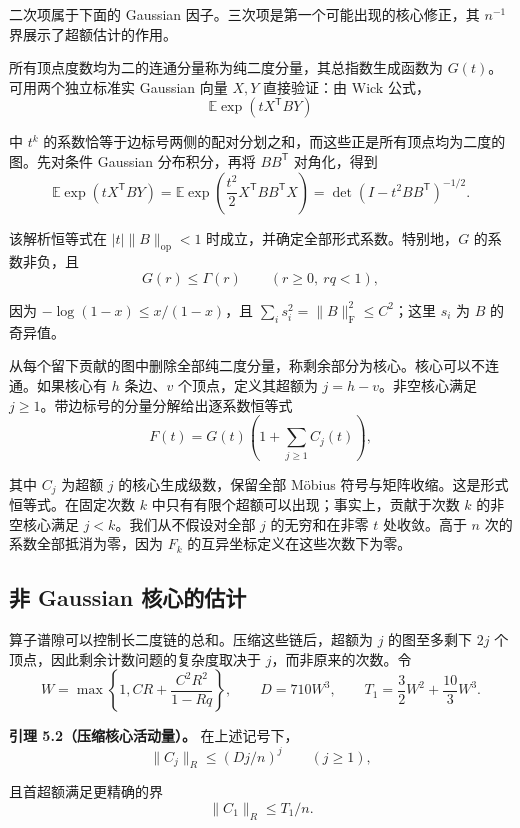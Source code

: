 \documentclass[11pt,a4paper]{article}
\makeatletter
\newcommand{\paperstatement}[3]{\par\addvspace{6pt}\Needspace{4\baselineskip}\phantomsection\def\@currentlabel{#2}\label{#3}\noindent\textbf{#1}\enspace}
\makeatother
\begin{document}
二次项属于下面的 Gaussian 因子。三次项是第一个可能出现的核心修正，其 \(n^{-1}\) 界展示了超额估计的作用。

所有顶点度数均为二的连通分量称为纯二度分量，其总指数生成函数为 \(G(t)\)。可用两个独立标准实 Gaussian 向量 \(X,Y\) 直接验证：由 Wick 公式，
\[\mathbb E\exp(tX^{\mathsf T}BY)\]

中 \(t^k\) 的系数恰等于边标号两侧的配对分划之和，而这些正是所有顶点均为二度的图。先对条件 Gaussian 分布积分，再将 \(BB^{\mathsf T}\) 对角化，得到
\[\mathbb E\exp(tX^{\mathsf T}BY)
=\mathbb E\exp\!\left(\frac{t^2}{2}X^{\mathsf T}BB^{\mathsf T}X\right)
=\det(I-t^2BB^{\mathsf T})^{-1/2}.\]

该解析恒等式在 \(|t|\|B\|_{\mathrm{op}}<1\) 时成立，并确定全部形式系数。特别地，\(G\) 的系数非负，且
\[G(r)\le\Gamma(r)\qquad(r\ge0,\ rq<1),\]

因为 \(-\log(1-x)\le x/(1-x)\)，且 \(\sum_i s_i^2=\|B\|_{\mathrm F}^2\le C^2\)；这里 \(s_i\) 为 \(B\) 的奇异值。

从每个留下贡献的图中删除全部纯二度分量，称剩余部分为核心。核心可以不连通。如果核心有 \(h\) 条边、\(v\) 个顶点，定义其超额为 \(j=h-v\)。非空核心满足 \(j\ge1\)。带边标号的分量分解给出逐系数恒等式
\[F(t)=G(t)\left(1+\sum_{j\ge1}C_j(t)\right),\]

其中 \(C_j\) 为超额 \(j\) 的核心生成级数，保留全部 Möbius 符号与矩阵收缩。这是形式恒等式。在固定次数 \(k\) 中只有有限个超额可以出现；事实上，贡献于次数 \(k\) 的非空核心满足 \(j<k\)。我们从不假设对全部 \(j\) 的无穷和在非零 \(t\) 处收敛。高于 \(n\) 次的系数全部抵消为零，因为 \(F_k\) 的互异坐标定义在这些次数下为零。

\subsection{非 Gaussian 核心的估计}\label{sec-5.3}

算子谱隙可以控制长二度链的总和。压缩这些链后，超额为 \(j\) 的图至多剩下 \(2j\) 个顶点，因此剩余计数问题的复杂度取决于 \(j\)，而非原来的次数。令
\[W=\max\left\{1,CR+\frac{C^2R^2}{1-Rq}\right\},
\qquad D=710W^3,\qquad
T_1=\frac32W^2+\frac{10}{3}W^3.\]

\paperstatement{引理 5.2（压缩核心活动量）。}{5.2}{thm-5.2} 在上述记号下，
\begin{equation}
\|C_j\|_R\le(Dj/n)^j\qquad(j\ge1),
\tag{5.2}\label{eq-core-activity}
\end{equation}

且首超额满足更精确的界
\[\|C_1\|_R\le T_1/n.\]
\end{document}
